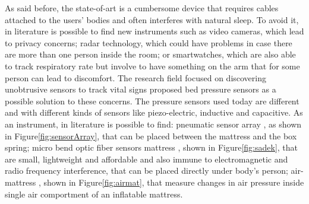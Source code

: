 As said before, the state-of-art is a cumbersome device that requires cables attached to the users' bodies and often interferes with natural sleep. To avoid it, in literature is possible to find new instruments such as video cameras, which lead to privacy concerns; radar technology, which could have problems in case there are more than one person inside the room; or smartwatches, which are also able to track respiratory rate but involve to have something on the arm that for some person can lead to discomfort.
\newline
The research field focused on discovering unobtrusive sensors to track vital signs proposed bed pressure sensors as a possible solution to these concerns. 
The pressure sensors used today are different and with different kinds of sensors like piezo-electric, inductive and capacitive. As an instrument, in literature is possible to find: pneumatic sensor array \cite{Holtzman2010ValidationEnvironments}, as shown in Figure\ref{fig:sensorArray}, that can be placed between the mattress and the box spring; micro bend optic fiber sensors mattress \cite{Sadek2017NonintrusiveStudy}, shown in Figure\ref{fig:sadek}, that are small, lightweight and affordable and also immune to electromagnetic and radio frequency interference, that can be placed directly under body's person; air-mattress \cite{articleAir}, shown in Figure\ref{fig:airmat}, that measure changes in air pressure inside single air comportment of an inflatable mattress.


